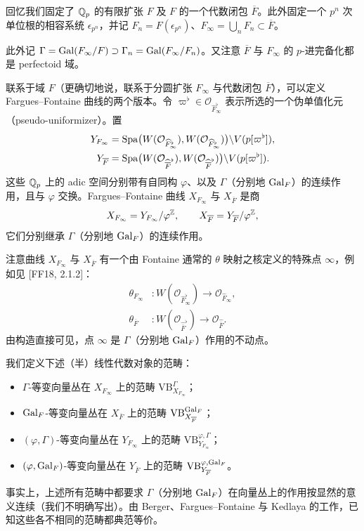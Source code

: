 回忆我们固定了 $\mathbb{Q}_p$ 的有限扩张 $F$ 及 $F$ 的一个代数闭包 $\overline{F}$。此外固定一个 $p^n$ 次单位根的相容系统 $\epsilon_{p^n}$，并记 $F_n=F(\epsilon_{p^n})$、$F_\infty=\bigcup_n F_n\subset\overline{F}$。

此外记 $\Gamma=\operatorname{Gal}(F_\infty/F)\supset\Gamma_n=\operatorname{Gal}(F_\infty/F_n)$。又注意 $\overline{F}$ 与 $F_\infty$ 的 $p$-进完备化都是 perfectoid 域。

联系于域 $F$（更确切地说，联系于分圆扩张 $F_\infty$ 与代数闭包 $\overline{F}$），可以定义 Fargues--Fontaine 曲线的两个版本。令 $\varpi^{\flat}\in\mathcal O_{\widehat F^{\flat}_\infty}$ 表示所选的一个伪单值化元（pseudo-uniformizer）。置
\begin{align*}
Y_{F_\infty}&=\operatorname{Spa}\bigl(W(\mathcal O_{\widehat F^{\flat}_\infty}),W(\mathcal O_{\widehat F^{\flat}_\infty})\bigr)\backslash V(p[\varpi^{\flat}]),\\
Y_{\overline{F}}&=\operatorname{Spa}\bigl(W(\mathcal O_{\widehat{\overline{F}}^{\flat}}),W(\mathcal O_{\widehat{\overline{F}}^{\flat}})\bigr)\backslash V(p[\varpi^{\flat}]).
\end{align*}
这些 $\mathbb{Q}_p$ 上的 adic 空间分别带有自同构 $\varphi$、以及 $\Gamma$（分别地 $\operatorname{Gal}_F$）的连续作用，且与 $\varphi$ 交换。Fargues--Fontaine 曲线 $X_{F_\infty}$ 与 $X_{\overline{F}}$ 是商
\[
X_{F_\infty}=Y_{F_\infty}/\varphi^{\mathbb{Z}},\qquad
X_{\overline{F}}=Y_{\overline{F}}/\varphi^{\mathbb{Z}},
\]
它们分别继承 $\Gamma$（分别地 $\operatorname{Gal}_F$）的连续作用。

注意曲线 $X_{F_\infty}$ 与 $X_{\overline{F}}$ 有一个由 Fontaine 通常的 $\theta$ 映射之核定义的特殊点 $\infty$，例如见 [FF18, 2.1.2]：
\begin{align*}
\theta_{F_\infty}&:W(\mathcal O_{\widehat F^{\flat}_\infty})\longrightarrow\mathcal O_{\widehat F_\infty},\\
\theta_{\overline{F}}&:W(\mathcal O_{\widehat{\overline{F}}^{\flat}})\longrightarrow\mathcal O_{\widehat{\overline{F}}}.
\end{align*}
由构造直接可见，点 $\infty$ 是 $\Gamma$（分别地 $\operatorname{Gal}_F$）作用的不动点。

我们定义下述（半）线性代数对象的范畴：
\begin{itemize}[leftmargin=2.2em,itemsep=0.15em]
\item $\Gamma$-等变向量丛在 $X_{F_\infty}$ 上的范畴 $\mathrm{VB}^{\Gamma}_{X_{F_\infty}}$；
\item $\operatorname{Gal}_F$-等变向量丛在 $X_{\overline{F}}$ 上的范畴 $\mathrm{VB}^{\operatorname{Gal}_F}_{X_{\overline{F}}}$；
\item $(\varphi,\Gamma)$-等变向量丛在 $Y_{F_\infty}$ 上的范畴 $\mathrm{VB}^{\varphi,\Gamma}_{Y_{F_\infty}}$；
\item $(\varphi,\operatorname{Gal}_F)$-等变向量丛在 $Y_{\overline{F}}$ 上的范畴 $\mathrm{VB}^{\varphi,\operatorname{Gal}_F}_{Y_{\overline{F}}}$。
\end{itemize}
事实上，上述所有范畴中都要求 $\Gamma$（分别地 $\operatorname{Gal}_F$）在向量丛上的作用按显然的意义连续（我们不明确写出）。由 Berger、Fargues--Fontaine 与 Kedlaya 的工作，已知这些各不相同的范畴都典范等价。

